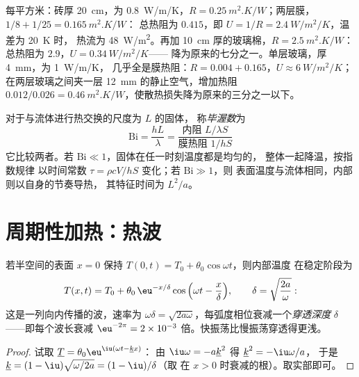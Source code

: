 \begin{example}[墙与窗]\label{ex:b2:heat-conduction:wall}
每平方米：砖厚 \qty{20}{cm}，为 \qty{0.8}{W/m/K}，$R =
\qty{0.25}{m^2.K/W}$；两层膜，$1/8 + 1/25 = \qty{0.165}{m^2.K/W}$：
总热阻为 $0.415$，即 $U = 1/R = \qty{2.4}{W/m^2/K}$，温差为 \qty{20}{K} 时，
热流为 \qty{48}{W/m^2}。再加 \qty{10}{cm} 厚的玻璃棉，$R =
\qty{2.5}{m^2.K/W}$：总热阻为 $2.9$，$U = \qty{0.34}{W/m^2/K}$——
降为原来的七分之一。单层玻璃，厚 \qty{4}{mm}，为 \qty{1}{W/m/K}，
几乎全是膜热阻：$R = 0.004 + 0.165$，$U \approx \qty{6}{W/m^2/K}$；
在两层玻璃之间夹一层 \qty{12}{mm} 的静止空气，增加热阻 $0.012/0.026 =
\qty{0.46}{m^2.K/W}$，使散热损失降为原来的三分之一以下。
\end{example}

\begin{definition}[毕渥数]\label{def:b2:heat-conduction:biot}
对于与流体进行热交换的尺度为 $L$ 的固体，
称\emph{毕渥数}为
\[
\mathrm{Bi} = \frac{hL}{\lambda} = \frac{\text{内阻 } L/\lambda S}{\text{膜热阻 } 1/hS}
\]
它比较两者。若 $\mathrm{Bi} \ll 1$，固体在任一时刻温度都是均匀的，
整体一起降温，按指数规律
以时间常数 $\tau = \rho c V/hS$ 变化；若 $\mathrm{Bi} \gg 1$，则
表面温度与流体相同，内部则以自身的节奏导热，
其特征时间为 $L^2/a$。
\end{definition}

\section{周期性加热：热波}

\begin{proposition}[半空间中的热波]\label{prop:b2:heat-conduction:wave}
若半空间的表面 $x = 0$ 保持 $T(0,t) = T_0 +
\theta_0\cos\omega t$，则内部温度
在稳定阶段为
\[
T(x,t) = T_0 + \theta_0\,\eu^{-x/\delta}\cos\Big(\omega t - \frac{x}{\delta}\Big),
\qquad \delta = \sqrt{\frac{2a}{\omega}} :
\]
这是一列向内传播的波，速率为 $\omega\delta =
\sqrt{2a\omega}$，每弧度相位衰减一个\emph{穿透深度} $\delta$
——即每个波长衰减 $\eu^{-2\pi} = 2 \times 10^{-3}$
倍。快振荡比慢振荡穿透得更浅。
\end{proposition}

\begin{proof}
试取 $\underline T = \theta_0\eu^{\iu(\omega t - \underline k x)}$：
由 $\iu\omega = -a\underline k^2$ 得 $\underline k^2 = -\iu\omega/a$，
于是 $\underline k = (1 - \iu)\sqrt{\omega/2a} = (1 - \iu)/\delta$（取
在 $x > 0$ 时衰减的根）。取实部即可。
\end{proof}

